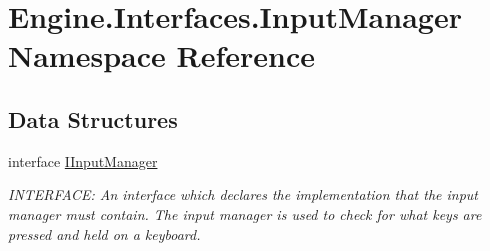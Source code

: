 \hypertarget{a00260}{}\section{Engine.\+Interfaces.\+Input\+Manager Namespace Reference}
\label{a00260}
\subsection*{Data Structures}
\begin{DoxyCompactItemize}
\item 
interface \hyperlink{a00450}{I\+Input\+Manager}
\begin{DoxyCompactList}\small\item\em I\+N\+T\+E\+R\+F\+A\+CE\+: An interface which declares the implementation that the input manager must contain. The input manager is used to check for what keys are pressed and held on a keyboard. \end{DoxyCompactList}\end{DoxyCompactItemize}
